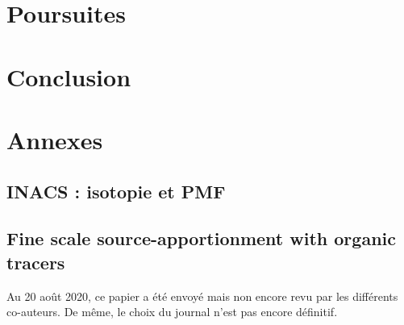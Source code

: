 \documentclass[a4paper,11pt]{book}
\begin{document}
\chapter{Poursuites}
\label{cha:travaux_futur}
\PartialToc
\clearpage

\clearpage
\printbibliography[segment=\therefsegment,heading=subbibliography]

\chapter*{Conclusion}%
\label{cha:conclusion}

\clearpage

\printbibliography

{\small
\listoftables
\listoffigures
}


\chapter*{Annexes}
\PartialToc

\fancyhead[L]{\small\textsl{\rightmark}}
\setcounter{table}{0}
\setcounter{figure}{0}
\setcounter{equation}{0}
\setcounter{section}{0}
\renewcommand{\thetable}{\thesection-\arabic{table}}
\renewcommand{\thefigure}{\thesection-\arabic{figure}}
\renewcommand{\theequation}{\thesection-\arabic{equation}}
\makeatletter
\renewcommand\thesection{Annexe \@Roman\c@section}
\renewcommand\thesubsection{Annexe \@Roman\c@section-\@arabic\c@subsection}
\makeatother

\clearpage
\section{INACS : isotopie et PMF}%
\label{annexe:INACS}


\section{Fine scale source-apportionment with organic tracers}%
\label{annexe:borlazaSA}
\begin{tcolorbox}[colback=red!5!white,colframe=blue,title=Note]
    Au 20 août 2020, ce papier a été envoyé mais non encore revu par les différents
    co-auteurs. De même, le choix du journal n'est pas encore définitif.
\end{tcolorbox}

\end{document}
